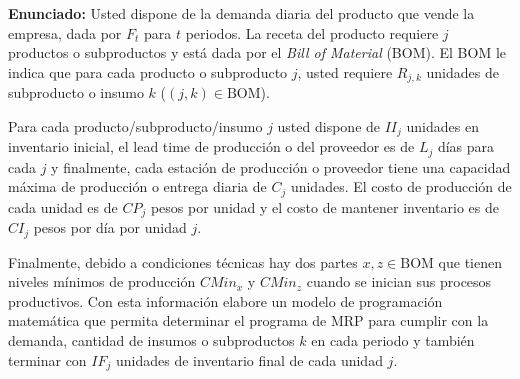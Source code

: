 \documentclass[11pt, a4paper]{article}
\begin{document}
  \textbf{Enunciado:}
  Usted dispone de la demanda diaria del producto que vende la empresa, dada por $F_t$ para $t$ periodos. La receta del producto requiere $j$ productos o subproductos y está dada por el \textit{Bill of Material} (BOM). El BOM le indica que para cada producto o subproducto $j$, usted requiere $R_{j,k}$ unidades de subproducto o insumo $k$ ($(j, k) \in \text{BOM}$). 

  Para cada producto/subproducto/insumo $j$ usted dispone de $II_j$ unidades en inventario inicial, el lead time de producción o del proveedor es de $L_j$ días para cada $j$ y finalmente, cada estación de producción o proveedor tiene una capacidad máxima de producción o entrega diaria de $C_j$ unidades. El costo de producción de cada unidad es de $CP_j$ pesos por unidad y el costo de mantener inventario es de $CI_j$ pesos por día por unidad $j$. 

  Finalmente, debido a condiciones técnicas hay dos partes $x, z \in \text{BOM}$ que tienen niveles mínimos de producción $CMin_x$ y $CMin_z$ cuando se inician sus procesos productivos. Con esta información elabore un modelo de programación matemática que permita determinar el programa de MRP para cumplir con la demanda, cantidad de insumos o subproductos $k$ en cada periodo y también terminar con $IF_j$ unidades de inventario final de cada unidad $j$.
\end{document}
